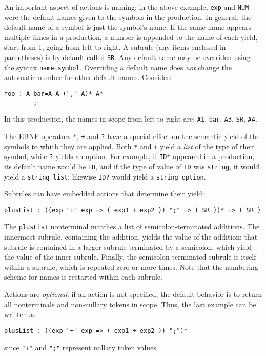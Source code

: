 An important aspect of actions is naming: in the above example, \texttt{exp} and \texttt{NUM} were the default names given to the symbols in the production.  In general, the default name of a symbol is just the symbol's name.  If the same name appears multiple times in a production, a number is appended to the name of each yield, start from 1, going from left to right.  A subrule (any items enclosed in parentheses) is by default called \texttt{SR}.  Any default name may be overriden using the syntax \texttt{name=symbol}.  Overriding a default name does \emph{not} change the automatic number for other default names.  Consider:
\begin{lstlisting}[language=MLAntlr]
    foo : A bar=A A ("," A)* A*
        ;
\end{lstlisting}%
In this production, the names in scope from left to right are: \texttt{A1}, \texttt{bar}, \texttt{A3}, \texttt{SR}, \texttt{A4}.

The EBNF operators \texttt{*}, \texttt{+} and \texttt{?} have a special effect on the semantic yield of the symbols to which they are applied.  Both \texttt{*} and \texttt{+} yield a \emph{list} of the type of their symbol, while \texttt{?} yields an option.  For example, if \texttt{ID*} appeared in a production, its default name would be \texttt{ID}, and if the type of value of \texttt{ID} was \texttt{string}, it would yield a \texttt{string list}; likewise \texttt{ID?} would yield a \texttt{string option}.  

Subrules can have embedded actions that determine their yield:
\begin{lstlisting}[language=MLAntlr]
    plusList : ((exp "+" exp => ( exp1 + exp2 )) ";" => ( SR ))* => ( SR )
\end{lstlisting}%
The \texttt{plusList} nonterminal matches a list of semicolon-terminated additions.  The innermost subrule, containing the addition, yields the value of the addition; that subrule is contained in a larger subrule terminated by a semicolon, which yield the value of the inner subrule.  Finally, the semicolon-terminated subrule is itself within a subrule, which is repeated zero or more times.  Note that the numbering scheme for names is restarted within each subrule.

Actions are \emph{optional}: if an action is not specified, the default behavior is to return all nonterminals and non-nullary tokens in scope.  Thus, the last example can be written as 
\begin{lstlisting}[language=MLAntlr]
    plusList : ((exp "+" exp => ( exp1 + exp2 )) ";")*
\end{lstlisting}%
since \texttt{"+"} and \texttt{";"} represent nullary token values.

